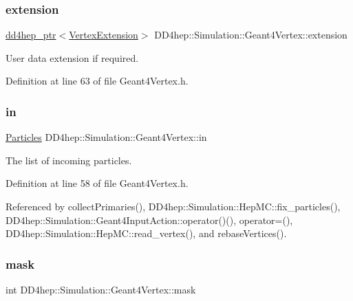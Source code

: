 \subsubsection{\texorpdfstring{extension}{extension}}
{\footnotesize\ttfamily \hyperlink{class_d_d4hep_1_1dd4hep__ptr}{dd4hep\+\_\+ptr}$<$\hyperlink{class_d_d4hep_1_1_simulation_1_1_vertex_extension}{Vertex\+Extension}$>$ D\+D4hep\+::\+Simulation\+::\+Geant4\+Vertex\+::extension}



User data extension if required. 



Definition at line 63 of file Geant4\+Vertex.\+h.

\hypertarget{class_d_d4hep_1_1_simulation_1_1_geant4_vertex_acf382e2d22907f72105b2a107e167327}{}\label{class_d_d4hep_1_1_simulation_1_1_geant4_vertex_acf382e2d22907f72105b2a107e167327} 
\subsubsection{\texorpdfstring{in}{in}}
{\footnotesize\ttfamily \hyperlink{class_d_d4hep_1_1_simulation_1_1_geant4_vertex_a7a0331b96dfa8ff9b4a802caa8dd031c}{Particles} D\+D4hep\+::\+Simulation\+::\+Geant4\+Vertex\+::in}



The list of incoming particles. 



Definition at line 58 of file Geant4\+Vertex.\+h.



Referenced by collect\+Primaries(), D\+D4hep\+::\+Simulation\+::\+Hep\+M\+C\+::fix\+\_\+particles(), D\+D4hep\+::\+Simulation\+::\+Geant4\+Input\+Action\+::operator()(), operator=(), D\+D4hep\+::\+Simulation\+::\+Hep\+M\+C\+::read\+\_\+vertex(), and rebase\+Vertices().

\hypertarget{class_d_d4hep_1_1_simulation_1_1_geant4_vertex_acd55879e69a2b47c68af29904abb584a}{}\label{class_d_d4hep_1_1_simulation_1_1_geant4_vertex_acd55879e69a2b47c68af29904abb584a} 
\subsubsection{\texorpdfstring{mask}{mask}}
{\footnotesize\ttfamily int D\+D4hep\+::\+Simulation\+::\+Geant4\+Vertex\+::mask}



